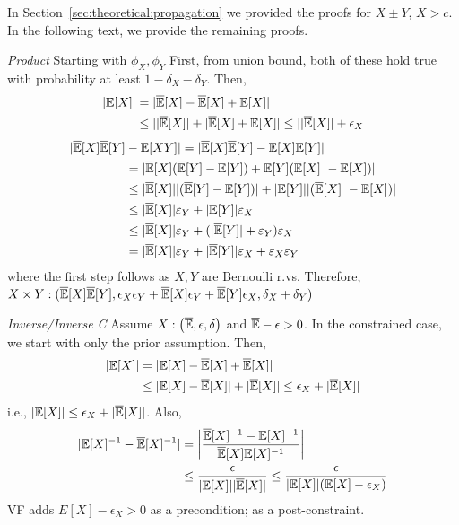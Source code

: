 \begin{subappendices}
In Section~\ref{sec:theoretical:propagation} we provided the proofs for $X\pm Y$, $X > c$.
In the following text, we provide the remaining proofs.

\noindent \textit{Product} Starting with $\phi_X, \phi_Y$
First, from union bound, both of these hold true with probability at least $1 - \delta_X - \delta_Y$.
Then,
{\allowdisplaybreaks
\begin{align*}
|\mathbb{E}[X]| &= |\overline{\mathbb{E}}[X] - \overline{\mathbb{E}}[X] + \mathbb{E}[X]|\\
        &\leq ||\overline{\mathbb{E}}[X]| +  |\overline{\mathbb{E}}[X] + \mathbb{E}[X]| \leq ||\overline{\mathbb{E}}[X]| + \epsilon_X \\
\end{align*}
}
\begin{align*}
    |\overline{\mathbb{E}}[X]\overline{\mathbb{E}}[Y] &- \mathbb{E}[XY]|  = |\overline{\mathbb{E}}[X]\overline{\mathbb{E}}[Y]  - \mathbb{E}[X]\mathbb{E}[Y]| \\
    &= |\overline{\mathbb{E}}[X](\overline{\mathbb{E}}[Y] - \mathbb{E}[Y]) + \mathbb{E}[Y] (\overline{\mathbb{E}}[X]\  - \mathbb{E}[X])| \\
    &\leq |\overline{\mathbb{E}}[X]||(\overline{\mathbb{E}}[Y] - \mathbb{E}[Y])| + |\mathbb{E}[Y]||(\overline{\mathbb{E}}[X]\  - \mathbb{E}[X])| \\
    &\leq |\overline{\mathbb{E}}[X]| \varepsilon_Y + |\mathbb{E}[Y]| \varepsilon_X \\
    &\leq |\overline{\mathbb{E}}[X]| \varepsilon_Y + (|\overline{\mathbb{E}}[Y]| + \varepsilon_Y) \varepsilon_X \\
    &= |\overline{\mathbb{E}}[X]| \varepsilon_Y + |\overline{\mathbb{E}}[Y]| \varepsilon_X + \varepsilon_X \varepsilon_Y
\end{align*}
where the first step follows as $X, Y$ are Bernoulli r.vs.
Therefore, $X \times Y: (\overline{\mathbb{E}}[X] \overline{\mathbb{E}}[Y], \epsilon_X \epsilon_Y + \overline{\mathbb{E}}[X] \epsilon_Y + \overline{\mathbb{E}}[Y] \epsilon_X, \delta_X + \delta_Y)$

\textit{Inverse/Inverse C} Assume $X: \left(\overline{\mathbb{E}}, \epsilon, \delta \right)$ and $\overline{\mathbb{E}} - \epsilon > 0$.
In the constrained case, we start with only the prior assumption. %
Then,
\begin{align*}
    |\mathbb{E}[X]| &= |\mathbb{E}[X] - \overline{\mathbb{E}}[X] + \overline{\mathbb{E}}[X]| \\
    &\leq |\mathbb{E}[X] - \overline{\mathbb{E}}[X]| + |\overline{\mathbb{E}}[X]| \leq \epsilon_X + |\overline{\mathbb{E}}[X]|
\end{align*}
i.e., $|\mathbb{E}[X]| \leq \epsilon_X + |\overline{\mathbb{E}}[X]|$. 
Also,
\begin{align*}
    |\mathbb{E}[X]^{-1} - \overline{\mathbb{E}}[X]^{-1}| &= \left|\frac{\overline{\mathbb{E}}[X]^{-1} - \mathbb{E}[X]^{-1}}{\overline{\mathbb{E}}[X]  \mathbb{E}[X]^{-1}}\right| \\
    &\leq \frac{\epsilon}{|\mathbb{E}[X]|  |\overline{\mathbb{E}}[X]|} \leq \frac{\epsilon}{|\mathbb{E}[X]| (\mathbb{E}[X] - \epsilon_X)}
\end{align*}
VF adds $E[X] - \epsilon_X > 0$ as a precondition; \AVOIRmethodname{} as a post-constraint.

\end{subappendices}
